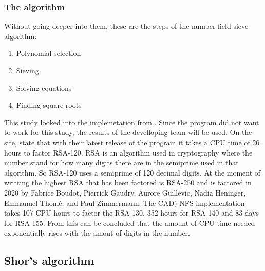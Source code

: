 \subsubsection{The algorithm}
Without going deeper into them, these are the steps of the number field sieve algorithm:
\begin{enumerate}
    \item Polynomial selection
    \item Sieving
    \item Solving equations
    \item Finding square roots
\end{enumerate}
This study looked into the implemetation from \textcite{cadoNFS}. Since the program did not want to work for this study, the results of the develloping team will be used.
On the site, \textcite{cadoNFS} state that with their latest release of the program it takes a CPU time of 26 hours to factor RSA-120. RSA is an algorithm used in cryptography where the number stand for how many digits there are in the semiprime used in that algorithm.
So RSA-120 uses a semiprime of 120 decimal digits. At the moment of writting the highest RSA that has been factored is RSA-250 and is factored in 2020 by Fabrice Boudot, Pierrick Gaudry, Aurore Guillevic, Nadia Heninger, Emmanuel Thomé, and Paul Zimmermann.
The CAD)-NFS implementation takes 107 CPU hours to factor the RSA-130, 352 hours for RSA-140 and 83 days for RSA-155. From this can be concluded that the amount of CPU-time needed exponentially rises with the amout of digits in the number.

\subsection{Shor's algorithm}
